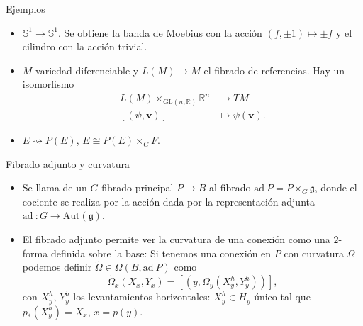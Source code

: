 \documentclass{beamer}
\newcommand{\ad}{\text{ad}}
\newcommand{\SF}{\mathbb{S}}
\newcommand{\RR}{\mathbb{R}}
\newcommand{\GG}{\mathfrak{g}}
\let\emph\relax
\begin{document}
\begin{frame}{Ejemplos}
  \begin{itemize}
    \item $\SF^1\rightarrow \SF^1$. Se obtiene la banda de Moebius con la acción $(f,\pm 1)\mapsto \pm f$ y el cilindro con la acción trivial.
      \pause
    \item $M$ variedad diferenciable y $L(M)\rightarrow M$ el fibrado de referencias. Hay un isomorfismo
      \begin{align*}
	L(M)\times_{\text{GL}(n,\RR)}\RR^n&\longrightarrow TM\\ 
	[(\psi,\mathbf{v})] &\longmapsto \psi(\mathbf{v}). 
	\end{align*}
	\pause
      \item $E \rightsquigarrow P(E)$, $E\cong P(E)\times_G F$.
  \end{itemize}
\end{frame}

\begin{frame}{Fibrado adjunto y curvatura}
  \begin{itemize}
    \item Se llama \emph{fibrado adjunto} de un $G$-fibrado principal $P\rightarrow B$ al fibrado $\ad\ P=P\times_G \GG$, donde el cociente se realiza por la acción dada por la representación adjunta $\ad\ :G\rightarrow \text{Aut}(\GG)$.
      \pause
    \item El fibrado adjunto permite ver la curvatura de una conexión como una $2$-forma definida sobre la base: \pause
      Si tenemos una conexión en $P$ con curvatura $\Omega$ podemos definir $\tilde{\Omega}\in \Omega(B,\ad\ P)$ como
      \begin{equation*}
	\tilde{\Omega}_x(X_x,Y_x)=[(y,\Omega_y(X_y^h,Y_y^h))],
      \end{equation*}
      con $X_y^h$, $Y_y^h$ los levantamientos horizontales: $X_y^h\in H_y$ único tal que $p_*(X^h_y)=X_x$, $x=p(y)$.
  \end{itemize}
\end{frame}
\end{document}
